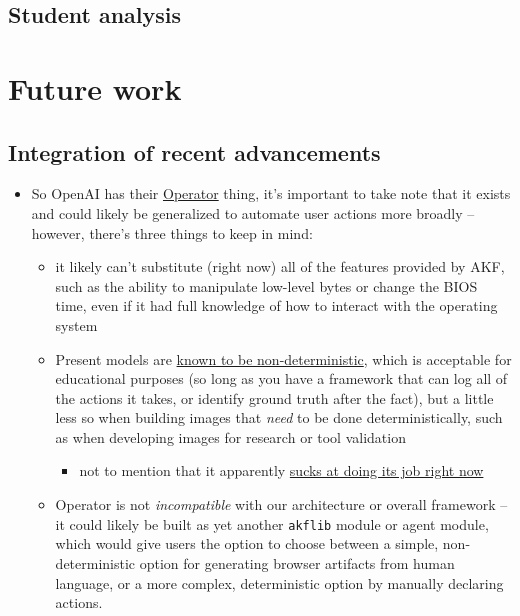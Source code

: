 \documentclass[letterpaper,12pt]{report}
\def\tightlist{}
\newcommand{\passthrough}[1]{#1}
\begin{document}
\section{Student analysis}\label{student-analysis}

\chapter{Future work}\label{chapter-eight}

\section{Integration of recent
advancements}\label{integration-of-recent-advancements}

\begin{itemize}
\tightlist
\item
  So OpenAI has their
  \href{https://openai.com/index/introducing-operator/}{Operator} thing,
  it's important to take note that it exists and could likely be
  generalized to automate user actions more broadly -- however, there's
  three things to keep in mind:

  \begin{itemize}
  \tightlist
  \item
    it likely can't substitute (right now) all of the features provided
    by AKF, such as the ability to manipulate low-level bytes or change
    the BIOS time, even if it had full knowledge of how to interact with
    the operating system
  \item
    Present models are
    \href{https://152334h.github.io/blog/non-determinism-in-gpt-4/}{known
    to be non-deterministic}, which is acceptable for educational
    purposes (so long as you have a framework that can log all of the
    actions it takes, or identify ground truth after the fact), but a
    little less so when building images that \emph{need} to be done
    deterministically, such as when developing images for research or
    tool validation

    \begin{itemize}
    \tightlist
    \item
      not to mention that it apparently
      \href{https://www.reddit.com/r/ChatGPTPro/comments/1i8jln3/i_am_among_the_first_people_to_gain_access_to/}{sucks
      at doing its job right now}
    \end{itemize}
  \item
    Operator is not \emph{incompatible} with our architecture or overall
    framework -- it could likely be built as yet another
    \passthrough{\lstinline!akflib!} module or agent module, which would
    give users the option to choose between a simple, non-deterministic
    option for generating browser artifacts from human language, or a
    more complex, deterministic option by manually declaring actions.
  \end{itemize}
\end{itemize}
\end{document}
